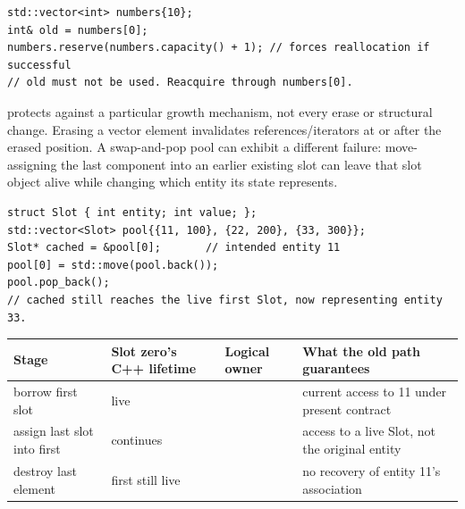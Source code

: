 \begin{verbatim}
std::vector<int> numbers{10};
int& old = numbers[0];
numbers.reserve(numbers.capacity() + 1); // forces reallocation if successful
// old must not be used. Reacquire through numbers[0].
\end{verbatim}

 protects against a particular growth mechanism, not every erase or structural change. Erasing a vector element invalidates references/iterators at or after the erased position. A swap-and-pop pool can exhibit a different failure: move-assigning the last component into an earlier existing slot can leave that slot object alive while changing which entity its state represents.

\begin{verbatim}
struct Slot { int entity; int value; };
std::vector<Slot> pool{{11, 100}, {22, 200}, {33, 300}};
Slot* cached = &pool[0];       // intended entity 11
pool[0] = std::move(pool.back());
pool.pop_back();
// cached still reaches the live first Slot, now representing entity 33.
\end{verbatim}

{\def\LTcaptype{none} %
\begin{longtable}[]{@{}
  >{\raggedright\arraybackslash}p{}
  >{\raggedright\arraybackslash}p{}
  >{\raggedright\arraybackslash}p{}
  >{\raggedright\arraybackslash}p{}@{}}
\toprule\noalign{}
\begin{minipage}[b]{\linewidth}\raggedright
Stage
\end{minipage} & \begin{minipage}[b]{\linewidth}\raggedright
Slot zero's C++ lifetime
\end{minipage} & \begin{minipage}[b]{\linewidth}\raggedright
Logical owner
\end{minipage} & \begin{minipage}[b]{\linewidth}\raggedright
What the old path guarantees
\end{minipage} \\
\midrule\noalign{}
\endhead
\bottomrule\noalign{}
\endlastfoot
borrow first slot & live & 11 & current access to 11 under present contract \\
assign last slot into first & continues & 33 & access to a live Slot, not the original entity \\
destroy last element & first still live & 33 & no recovery of entity 11's association \\
\end{longtable}
}

